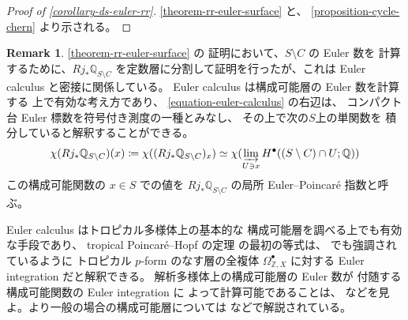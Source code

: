 \documentclass[a4paper,dvipdfmx,reqno,12pt]{amsart}
\theoremstyle{definition}
\newtheorem{example}[theorem]{Example}
\newtheorem{remark}[theorem]{Remark}
\newcommand{\deq}{\coloneqq}
\newcommand{\opn}[1]{\operatorname{#1}}
\numberwithin{equation}{section}
\begin{document}
\begin{proof}[{Proof of \cref{corollary-ds-euler-rr}}]
\cref{theorem-rr-euler-surface} と、
\cref{proposition-cycle-chern} より示される。
\end{proof}

\begin{remark}
\cref{theorem-rr-euler-surface} の
証明において、$S\setminus C$ の Euler 数を
計算するために、$Rj_*\mathbb{Q}_{S\setminus C}$
を定数層に分割して証明を行ったが、これは
Euler calculus と密接に関係している\cite{MR970076,MR1115569}。
Euler calculus は構成可能層の Euler 数を計算する
上で有効な考え方であり、
\cref{equation-euler-calculus} の右辺は、
コンパクト台 Euler 標数を符号付き測度の一種とみなし、
その上で次の$S$上の単関数を
積分していると解釈することができる。
\begin{align}
\chi(Rj_*\mathbb{Q}_{S\setminus C})(x)\deq \chi((Rj_*\mathbb{Q}_{S\setminus C})_x) 
\simeq \chi(\varinjlim_{U\ni x} H^{\bullet}((S\setminus C)
\cap U;\mathbb{Q}))   
\end{align}
この構成可能関数の $x\in S$ での値を
$Rj_*\mathbb{Q}_{S\setminus C}$
の局所 Euler--Poincar\'e 指数と呼ぶ。

Euler calculus はトロピカル多様体上の基本的な
構成可能層を調べる上でも有効な手段であり、
tropical Poincar\'e--Hopf の定理
\cite[Theorem 4.7]{MR4540954} の最初の等式は、
\cite[Remark 4.8]{MR4540954} でも強調されているように
トロピカル $p$-form のなす層の全複体 
$\Omega^{\bullet}_{\mathbb{Z},X}$ に対する Euler integration 
だと解釈できる。
解析多様体上の構成可能層の Euler 数が
付随する構成可能関数の Euler integration に
よって計算可能であることは、\cite[Theorem 9.7.1]{MR1299726}
などを見よ。より一般の場合の構成可能層については
\cite[Chapter 2]{MR2031639} などで解説されている。
\end{remark}

\end{document}
